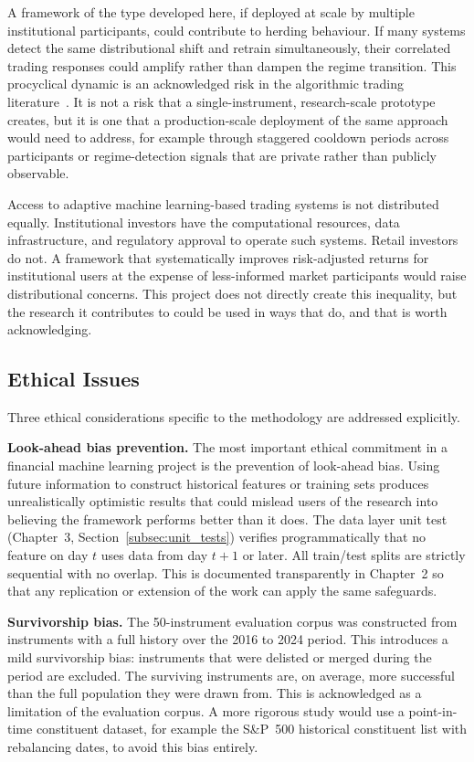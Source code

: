 \begin{appendices}
A framework of the type developed here, if deployed at scale by multiple institutional participants, could contribute to herding behaviour. If many systems detect the same distributional shift and retrain simultaneously, their correlated trading responses could amplify rather than dampen the regime transition. This procyclical dynamic is an acknowledged risk in the algorithmic trading literature~\cite{kirilenko2017,pasquale2015}. It is not a risk that a single-instrument, research-scale prototype creates, but it is one that a production-scale deployment of the same approach would need to address, for example through staggered cooldown periods across participants or regime-detection signals that are private rather than publicly observable.

Access to adaptive machine learning-based trading systems is not distributed equally. Institutional investors have the computational resources, data infrastructure, and regulatory approval to operate such systems. Retail investors do not. A framework that systematically improves risk-adjusted returns for institutional users at the expense of less-informed market participants would raise distributional concerns. This project does not directly create this inequality, but the research it contributes to could be used in ways that do, and that is worth acknowledging.

\subsection{Ethical Issues}
\label{subsec:ethical}

Three ethical considerations specific to the methodology are addressed explicitly.

\textbf{Look-ahead bias prevention.} The most important ethical commitment in a financial machine learning project is the prevention of look-ahead bias. Using future information to construct historical features or training sets produces unrealistically optimistic results that could mislead users of the research into believing the framework performs better than it does. The data layer unit test (Chapter~3, Section~\ref{subsec:unit_tests}) verifies programmatically that no feature on day $t$ uses data from day $t{+}1$ or later. All train/test splits are strictly sequential with no overlap. This is documented transparently in Chapter~2 so that any replication or extension of the work can apply the same safeguards.

\textbf{Survivorship bias.} The 50-instrument evaluation corpus was constructed from instruments with a full history over the 2016 to 2024 period. This introduces a mild survivorship bias: instruments that were delisted or merged during the period are excluded. The surviving instruments are, on average, more successful than the full population they were drawn from. This is acknowledged as a limitation of the evaluation corpus. A more rigorous study would use a point-in-time constituent dataset, for example the S\&P~500 historical constituent list with rebalancing dates, to avoid this bias entirely.


\end{appendices}
